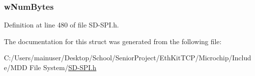 \hypertarget{struct_a_s_y_n_c___i_o_a9131e939b85942d556649db37be08d0e}{}
\subsubsection[{w\+Num\+Bytes}]{ w\+Num\+Bytes}\label{struct_a_s_y_n_c___i_o_a9131e939b85942d556649db37be08d0e}


Definition at line 480 of file S\+D-\/\+S\+P\+I.\+h.



The documentation for this struct was generated from the following file\+:\begin{DoxyCompactItemize}
\item 
C\+:/\+Users/mainuser/\+Desktop/\+School/\+Senior\+Project/\+Eth\+Kit\+T\+C\+P/\+Microchip/\+Include/\+M\+D\+D File System/\hyperlink{_s_d-_s_p_i_8h}{S\+D-\/\+S\+P\+I.\+h}\end{DoxyCompactItemize}
